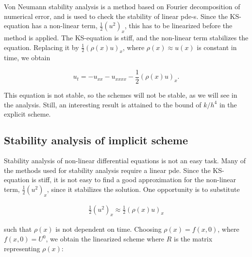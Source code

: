 

Von Neumann stability analysis is a method based on Fourier decomposition of numerical error, and is used to check the stability of linear pde-s. Since the KS-equation has a non-linear term, $\frac{1}{2}(u^2)_x$, this has to be linearized before the method is applied. The KS-equation is stiff, and the non-linear term stabilizes the equation. Replacing it by $\frac{1}{2}(\rho(x)u)_x$, where $\rho(x) \approx u(x)$ is constant in time, we obtain 

\begin{equation}
u_t  = - u_{xx} - u_{xxxx} - \frac{1}{2}\left(\rho(x)u\right)_x.
\end{equation}

This equation is not stable, so the schemes will not be stable, as we will see in the analysis. Still, an interesting result is attained to the bound of $k/h^4$ in the explicit scheme.  

\subsection*{Stability analysis of implicit scheme}

Stability analysis of non-linear differential equations is not an easy task. Many of the methods used for stability analysis require a linear pde. Since the KS-equation is stiff, it is not easy to find a good approximation for the non-linear term, $\frac{1}{2}(u^2)_x$, since it stabilizes the solution. One opportunity is to substitute 

\begin{align*}
\frac{1}{2}(u^2)_x \approx \frac{1}{2}(\rho(x)u)_x
\end{align*}

such that $\rho(x)$ is not dependent on time. Choosing $\rho(x) = f(x,0)$, where $f(x,0) = U^0$, we obtain the linearized scheme where $R$ is the matrix representing $\rho(x)$:


